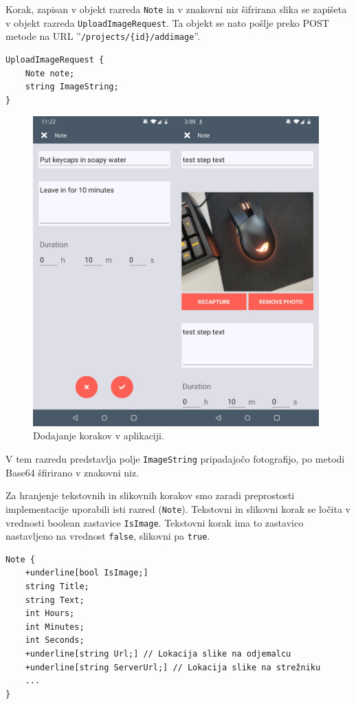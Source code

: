\documentclass[a4paper, 12pt]{book}
\begin{document}
Korak, zapisan v objekt razreda \texttt{Note} in v znakovni niz šifrirana slika se zapišeta v objekt razreda \texttt{UploadImageRequest}.
Ta objekt se nato pošlje preko POST metode na URL ''\texttt{/projects/\{id\}/addimage}''.

\begin{verbatim}
UploadImageRequest { 
    Note note; 
    string ImageString; 
}
\end{verbatim}

\begin{figure}[H]
\begin{center}
\includegraphics[width=11cm]{app_note_image}
\end{center}
	\caption{Dodajanje korakov v aplikaciji.}
\label{note_image}
\end{figure}

V tem razredu predstavlja polje \texttt{ImageString} pripadajočo fotografijo, po metodi Base64 šfirirano v znakovni niz.

Za hranjenje tekstovnih in slikovnih korakov smo zaradi preprostosti implementacije uporabili isti razred (\texttt{Note}).
Tekstovni in slikovni korak se ločita v vrednosti boolean zastavice \texttt{IsImage}.
Tekstovni korak ima to zastavico nastavljeno na vrednost \texttt{false}, slikovni pa \texttt{true}.

\begin{Verbatim}[commandchars=+\[\]]
Note { 
    +underline[bool IsImage;]
    string Title; 
    string Text; 
    int Hours; 
    int Minutes;
    int Seconds; 
    +underline[string Url;] // Lokacija slike na odjemalcu 
    +underline[string ServerUrl;] // Lokacija slike na strežniku
    ... 
}
\end{Verbatim}
\end{document}
